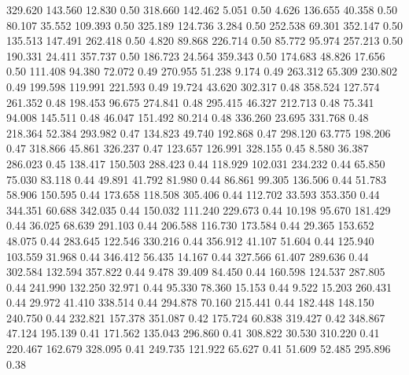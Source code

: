  329.620  143.560   12.830         0.50
 318.660  142.462    5.051         0.50
   4.626  136.655   40.358         0.50
  80.107   35.552  109.393         0.50
 325.189  124.736    3.284         0.50
 252.538   69.301  352.147         0.50
 135.513  147.491  262.418         0.50
   4.820   89.868  226.714         0.50
  85.772   95.974  257.213         0.50
 190.331   24.411  357.737         0.50
 186.723   24.564  359.343         0.50
 174.683   48.826   17.656         0.50
 111.408   94.380   72.072         0.49
 270.955   51.238    9.174         0.49
 263.312   65.309  230.802         0.49
 199.598  119.991  221.593         0.49
  19.724   43.620  302.317         0.48
 358.524  127.574  261.352         0.48
 198.453   96.675  274.841         0.48
 295.415   46.327  212.713         0.48
  75.341   94.008  145.511         0.48
  46.047  151.492   80.214         0.48
 336.260   23.695  331.768         0.48
 218.364   52.384  293.982         0.47
 134.823   49.740  192.868         0.47
 298.120   63.775  198.206         0.47
 318.866   45.861  326.237         0.47
 123.657  126.991  328.155         0.45
   8.580   36.387  286.023         0.45
 138.417  150.503  288.423         0.44
 118.929  102.031  234.232         0.44
  65.850   75.030   83.118         0.44
  49.891   41.792   81.980         0.44
  86.861   99.305  136.506         0.44
  51.783   58.906  150.595         0.44
 173.658  118.508  305.406         0.44
 112.702   33.593  353.350         0.44
 344.351   60.688  342.035         0.44
 150.032  111.240  229.673         0.44
  10.198   95.670  181.429         0.44
  36.025   68.639  291.103         0.44
 206.588  116.730  173.584         0.44
  29.365  153.652   48.075         0.44
 283.645  122.546  330.216         0.44
 356.912   41.107   51.604         0.44
 125.940  103.559   31.968         0.44
 346.412   56.435   14.167         0.44
 327.566   61.407  289.636         0.44
 302.584  132.594  357.822         0.44
   9.478   39.409   84.450         0.44
 160.598  124.537  287.805         0.44
 241.990  132.250   32.971         0.44
  95.330   78.360   15.153         0.44
   9.522   15.203  260.431         0.44
  29.972   41.410  338.514         0.44
 294.878   70.160  215.441         0.44
 182.448  148.150  240.750         0.44
 232.821  157.378  351.087         0.42
 175.724   60.838  319.427         0.42
 348.867   47.124  195.139         0.41
 171.562  135.043  296.860         0.41
 308.822   30.530  310.220         0.41
 220.467  162.679  328.095         0.41
 249.735  121.922   65.627         0.41
  51.609   52.485  295.896         0.38

